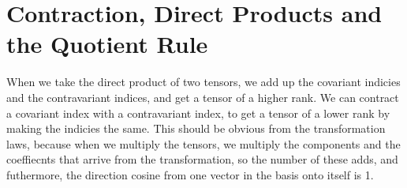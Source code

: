 \documentclass[11pt,notitlepage]{article}
\begin{document}
\section{Contraction, Direct Products and the Quotient Rule}
When we take the direct product of two tensors, we add up the covariant indicies and the contravariant indices, and get a tensor of a higher rank. We can contract a covariant index with a contravariant index, to get a tensor of a lower rank by making the indicies the same. This should be obvious from the transformation laws, because when we multiply the tensors, we multiply the components and the coeffiecnts that arrive from the transformation, so the number of these adds, and futhermore, the direction cosine from one vector in the basis onto itself is 1. 
\end{document}
